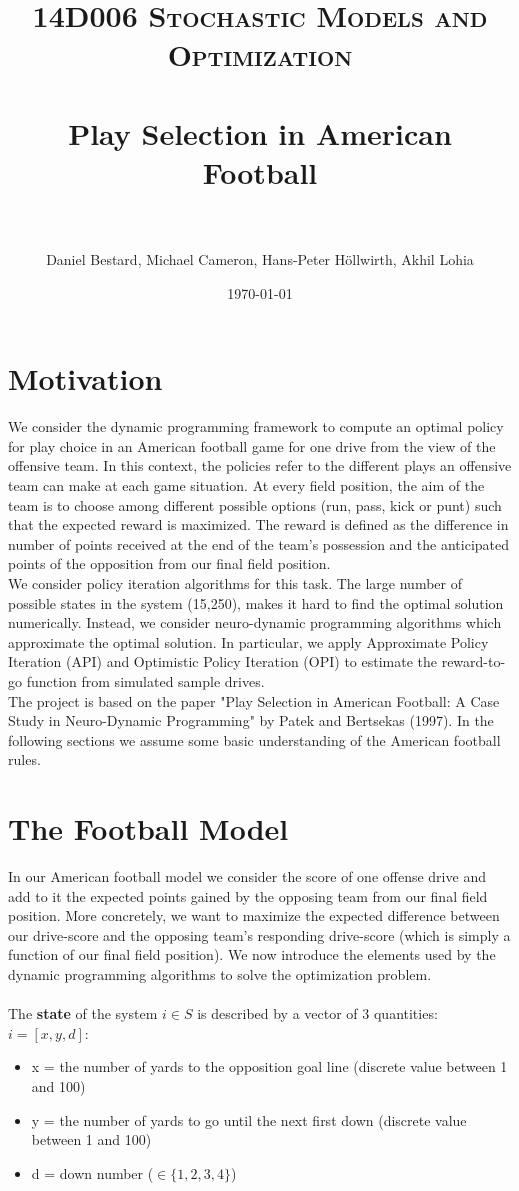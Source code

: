 \documentclass[11pt, oneside]{article}   	%
\title{
\normalfont \normalsize
\textsc{14D006 Stochastic Models and Optimization} \\ [25pt] %
\horrule{0.5pt} \\[0.4cm] %
\huge Play Selection in American Football\\ %
\horrule{2pt} \\[0.5cm] %
}
\author{Daniel Bestard, Michael Cameron, Hans-Peter H{\"o}llwirth, Akhil Lohia} %
\date{\normalsize\today} %
\begin{document}
\maketitle

\section{Motivation}
We consider the dynamic programming framework to compute an optimal policy for play choice in an American football game for one drive from the view of the offensive team. In this context, the policies refer to the different plays an offensive team can make at each game situation. At every field position, the aim of the team is to choose among different possible options (run, pass, kick or punt) such that the expected reward is maximized. The reward is defined as the difference in number of points received at the end of the team's possession and the anticipated points of the opposition from our final field position. \\

We consider policy iteration algorithms for this task. The large number of possible states in the system (15,250), makes it hard to find the optimal solution numerically. Instead, we consider neuro-dynamic programming algorithms which approximate the optimal solution. In particular, we apply Approximate Policy Iteration (API) and Optimistic Policy Iteration (OPI) to estimate the reward-to-go function from simulated sample drives.\\

The project is based on the paper "Play Selection in American Football: A Case Study in Neuro-Dynamic Programming" by Patek and Bertsekas (1997). In the following sections we assume some basic understanding of the American football rules.


\section{The Football Model}
In our American football model we consider the score of one offense drive and add to it the expected points gained by the opposing team from our final field position. More concretely, we want to maximize the expected difference between our drive-score and the opposing team's responding drive-score (which is simply a function of our final field position). We now introduce the elements used by the dynamic programming algorithms to solve the optimization problem. \\\\
The \textbf{state} of the system $i \in S$ is described by a vector of 3 quantities: $i = [x,y,d]$:
\begin{itemize}
\item x = the number of yards to the opposition goal line (discrete value between 1 and 100)
\item y = the number of yards to go until the next first down (discrete value between 1 and 100)
\item d = down number ($\in \{1,2,3,4\}$)
\end{itemize}
\end{document}
